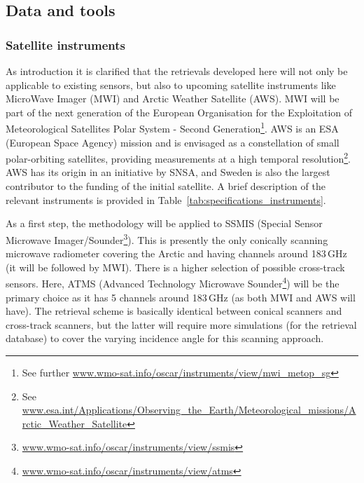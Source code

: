 \documentclass[12pt,oneside,a4paper]{article}
\begin{document}
\subsection{Data and tools}
% 
\subsubsection{Satellite instruments}

As introduction it is clarified that the retrievals developed here will not
only be applicable to existing sensors, but also to upcoming satellite
instruments like MicroWave Imager (MWI) and Arctic Weather Satellite (AWS). MWI
will be part of the next generation of the European Organisation for the
Exploitation of Meteorological Satellites Polar System - Second
Generation\footnote{See further
  \url{www.wmo-sat.info/oscar/instruments/view/mwi_metop_sg}}. AWS is an ESA (European Space Agency)
mission and is envisaged as a constellation of small polar-orbiting satellites,
providing measurements at a high temporal resolution\footnote{See
  \url{www.esa.int/Applications/Observing_the_Earth/Meteorological_missions/Arctic_Weather_Satellite}}.
AWS has its origin in an initiative by SNSA, and Sweden is also the largest
contributor to the funding of the initial satellite. A brief description of the
relevant instruments is provided in Table~\ref{tab:specifications_instruments}.

As a first step, the methodology will be applied to SSMIS (Special Sensor
Microwave
Imager/Sounder\footnote{\url{www.wmo-sat.info/oscar/instruments/view/ssmis}}).
This is presently the only conically scanning microwave radiometer covering the
Arctic and having channels around 183\,GHz (it will be followed by MWI). There is a
higher selection of possible cross-track sensors. Here, ATMS (Advanced
Technology Microwave
Sounder\footnote{\url{www.wmo-sat.info/oscar/instruments/view/atms}}) will be
the primary choice as it has 5 channels around 183\,GHz (as both MWI and AWS
will have). The retrieval scheme is basically identical between conical
scanners and cross-track scanners, but the latter will require more simulations
(for the retrieval database) to cover the varying incidence angle for this
scanning approach.
\end{document}
